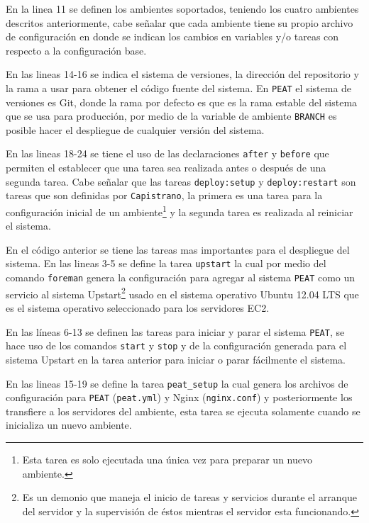 En la linea 11 se definen los ambientes soportados, teniendo los cuatro
ambientes descritos anteriormente, cabe señalar que cada ambiente tiene
su propio archivo de configuración en donde se indican los cambios en variables
y/o tareas con respecto a la configuración base.

En las lineas 14-16 se indica el sistema de versiones, la dirección del repositorio
y la rama a usar para obtener el código fuente del sistema.
En \texttt{PEAT} el sistema de versiones es Git, donde la rama por defecto
es  que es la rama estable del sistema que
se usa para producción, por medio de la variable de ambiente \texttt{BRANCH} es
posible hacer el despliegue de cualquier versión del sistema.

En las lineas 18-24 se tiene el uso de las declaraciones \texttt{after}
y \texttt{before} que permiten el establecer que una tarea sea realizada
antes o después de una segunda tarea. Cabe señalar que las tareas
\texttt{deploy:setup} y \texttt{deploy:restart} son tareas que son definidas
por \texttt{Capistrano}, la primera es una tarea para la configuración inicial
de un ambiente\footnote{Esta tarea es solo ejecutada una única vez para preparar
  un nuevo ambiente.} y la segunda tarea es realizada al reiniciar el sistema.



En el código anterior se tiene las tareas mas importantes para el
despliegue del sistema. En las lineas 3-5 se define la tarea \texttt{upstart}
la cual por medio del comando \texttt{foreman} genera la configuración para agregar
al sistema \texttt{PEAT} como un servicio al sistema Upstart\footnote{Es un demonio
  que maneja el inicio de tareas y servicios durante el arranque del servidor y la
  supervisión de éstos mientras el servidor esta funcionando.} usado en el sistema
operativo Ubuntu 12.04 LTS que es el sistema operativo seleccionado para los
servidores EC2.

En las líneas 6-13 se definen las tareas para iniciar y parar el sistema
\texttt{PEAT}, se hace uso de los comandos \texttt{start} y \texttt{stop} y
de la configuración generada para el sistema Upstart en la tarea anterior para
iniciar o parar fácilmente el sistema.

En las lineas 15-19 se define la tarea \texttt{peat\_setup} la cual genera
los archivos de configuración para \texttt{PEAT} (\texttt{peat.yml}) y
Nginx (\texttt{nginx.conf}) y posteriormente los transfiere a los servidores
del ambiente, esta tarea se ejecuta solamente cuando se inicializa un nuevo
ambiente.


